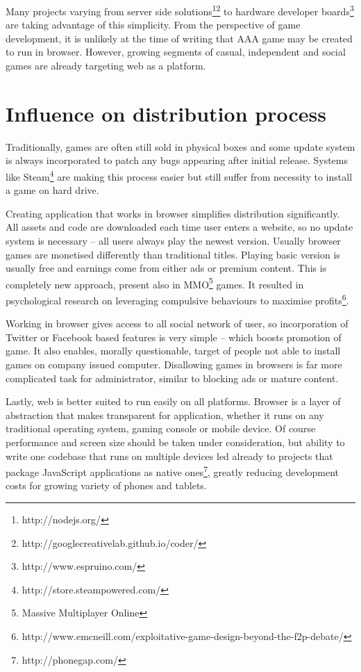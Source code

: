 Many projects varying from server side solutions\footnote{http://nodejs.org/}\footnote{http://googlecreativelab.github.io/coder/} to hardware developer boards\footnote{http://www.espruino.com/} are taking advantage of this simplicity. From the perspective of game development, it is unlikely at the time of writing that AAA game may be created to run in browser. However, growing segments of casual, independent and social games are already targeting web as a platform.

\section{Influence on distribution process}

Traditionally, games are often still sold in physical boxes and some update system is always incorporated to patch any bugs appearing after initial release. Systems like Steam\footnote{http://store.steampowered.com/} are making this process easier but still suffer from necessity to install a game on hard drive.

Creating application that works in browser simplifies distribution significantly. All assets and code are downloaded each time user enters a website, so no update system is necessary -- all users always play the newest version. Usually browser games are monetised differently than traditional titles. Playing basic version is usually free and earnings come from either ads or premium content. This is completely new approach, present also in MMO\footnote{Massive Multiplayer Online} games. It resulted in psychological research on leveraging compulsive behaviours to maximise profits\footnote{http://www.emcneill.com/exploitative-game-design-beyond-the-f2p-debate/}.

Working in browser gives access to all social network of user, so incorporation of Twitter or Facebook based features is very simple -- which boosts promotion of game. It also enables, morally questionable, target of people not able to install games on company issued computer. Disallowing games in browsers is far more complicated task for administrator, similar to blocking ads or mature content.

Lastly, web is better suited to run easily on all platforms. Browser is a layer of abstraction that makes transparent for application, whether it runs on any traditional operating system, gaming console or mobile device. Of course  performance and screen size should be taken under consideration, but ability to write one codebase that runs on multiple devices led already to projects that package JavaScript applications as native ones\footnote{http://phonegap.com/}, greatly reducing development costs for growing variety of phones and tablets.

